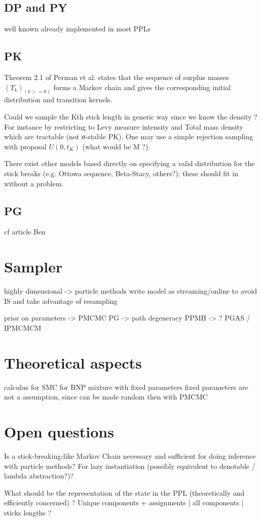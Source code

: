 \subsection{DP and PY}
well known
already implemented in most \gls{PPL}s

\subsection{PK}
Theorem 2.1 of Perman et al. states that the sequence of surplus masses $(T_k)_(k>=0)$ forms a Markov chain and gives the corresponding initial distribution and transition kernels.

Could we sample the Kth stick length in generic way since we know the density ? For instance by restricting to Levy measure intensity and Total mass density which are tractable (not σ-stable PK). One may use a simple rejection sampling with proposal $U(0, t_K)$ (what would be M ?).

There exist other models based directly on specifying a valid distribution for the stick breaks (e.g. Ottowa sequence, Beta-Stacy, others?); these should fit in without a problem.

\subsection{PG}
cf article Ben

\section{Sampler}

highly dimensional -> particle methods
write model as streaming/online to avoid IS and take advantage of resampling

prior on parameters -> PMCMC
PG -> path degeneracy
PPMH -> ?
PGAS / IPMCMCM

\section{Theoretical aspects}
calculus for SMC for BNP mixture with fixed parameters
fixed parameters are not a assumption, since can be made random then with PMCMC

\section{Open questions}
Is a stick-breaking-like Markov Chain necessary and sufficient for doing inference with particle methods? For lazy instantiation (possibly equivalent to denotable / lambda abstraction?)?

What should be the representation of the state in the PPL (theoretically and efficiently concerned) ? Unique components + assignments | all components | sticks lengths ?   

